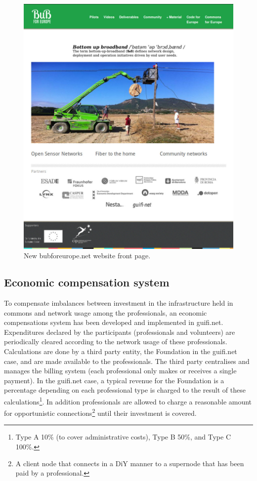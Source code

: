 \begin{figure}[H]
  \centering
  \includegraphics[width=0.95\linewidth]{sect2/figures/bubforeurope_net_crop.jpg}
  \caption[New bubforeurope.net website front page.]{New bubforeurope.net website front page.}
  \label{fig:bubforeurope.net}
\end{figure}


\subsection{Economic compensation system}

To compensate imbalances between investment in the infrastructure held in commons and network usage among the professionals, an economic compensations system has been developed and implemented in guifi.net. Expenditures declared by the participants (professionals and volunteers) are periodically cleared according to the network usage of these professionals. Calculations are done by a third party entity, the Foundation in the guifi.net case, and are made available to the professionals. The third party centralises and manages the billing system (each professional only makes or receives a single payment). In the guifi.net case, a typical revenue for the Foundation is a percentage depending on each professional type is charged to the result of these calculations\footnote{Type A 10\% (to cover administrative costs), Type B 50\%, and Type C 100\%.}. In addition professionals are allowed to charge a reasonable amount for opportunistic connections\footnote{A client node that connects in a DiY manner to a supernode that has been paid by a professional.} until their investment is covered.

